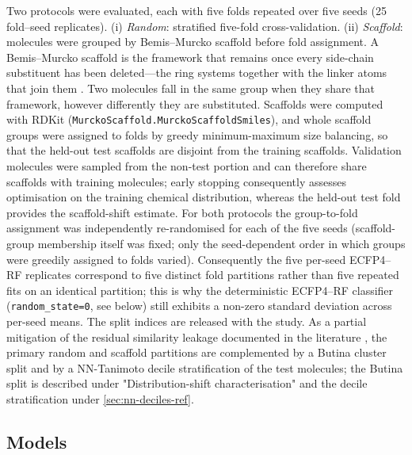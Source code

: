 \documentclass[11pt,a4paper]{article}
\begin{document}
Two protocols were evaluated, each with five folds repeated over five seeds (\num{25} fold--seed replicates). (i) \emph{Random}: stratified five-fold cross-validation. (ii) \emph{Scaffold}: molecules were grouped by Bemis--Murcko scaffold before fold assignment. A Bemis--Murcko scaffold is the framework that remains once every side-chain substituent has been deleted---the ring systems together with the linker atoms that join them \citep{bemis_murcko_1996}. Two molecules fall in the same group when they share that framework, however differently they are substituted. Scaffolds were computed with RDKit (\texttt{MurckoScaffold.MurckoScaffoldSmiles}), and whole scaffold groups were assigned to folds by greedy minimum-maximum size balancing, so that the held-out test scaffolds are disjoint from the training scaffolds. Validation molecules were sampled from the non-test portion and can therefore share scaffolds with training molecules; early stopping consequently assesses optimisation on the training chemical distribution, whereas the held-out test fold provides the scaffold-shift estimate. For both protocols the group-to-fold assignment was independently re-randomised for each of the five seeds (scaffold-group membership itself was fixed; only the seed-dependent order in which groups were greedily assigned to folds varied). Consequently the five per-seed ECFP4--RF replicates correspond to five distinct fold partitions rather than five repeated fits on an identical partition; this is why the deterministic ECFP4--RF classifier (\texttt{random\_state=0}, see below) still exhibits a non-zero standard deviation across per-seed means. The split indices are released with the study. As a partial mitigation of the residual similarity leakage documented in the literature \citep{bash2025umap}, the primary random and scaffold partitions are complemented by a Butina cluster split and by a NN-Tanimoto decile stratification of the test molecules; the Butina split is described under "Distribution-shift characterisation" and the decile stratification under \cref{sec:nn-deciles-ref}.

\subsection{Models}
\end{document}

